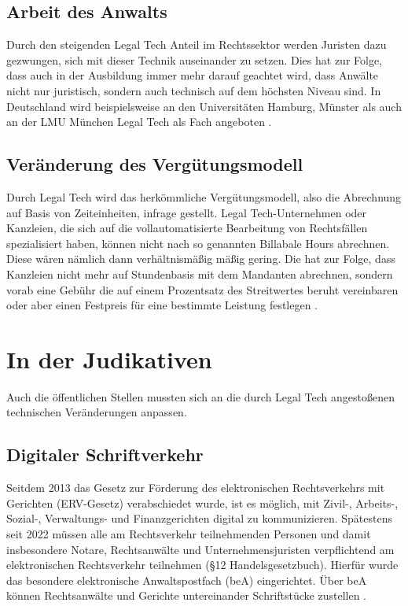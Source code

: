 \subsection{Arbeit des Anwalts}
Durch den steigenden Legal Tech Anteil im Rechtssektor werden Juristen dazu gezwungen, sich mit dieser Technik auseinander zu setzen. Dies hat zur Folge, dass auch in der Ausbildung immer mehr darauf geachtet wird, dass Anwälte nicht nur juristisch, sondern auch technisch auf dem höchsten Niveau sind. In Deutschland wird beispielsweise an den Universitäten Hamburg, Münster als auch an der LMU München Legal Tech als Fach angeboten . 
\subsection{Veränderung des Vergütungsmodell}
Durch Legal Tech wird das herkömmliche Vergütungsmodell, also die Abrechnung auf Basis von Zeiteinheiten, infrage gestellt. Legal Tech-Unternehmen oder Kanzleien, die sich auf die vollautomatisierte Bearbeitung von Rechtsfällen spezialisiert haben, können nicht nach so genannten Billabale Hours abrechnen. Diese wären nämlich dann verhältnismäßig mäßig gering. Die hat zur Folge, dass Kanzleien nicht mehr auf Stundenbasis mit dem Mandanten abrechnen, sondern vorab eine Gebühr die auf einem Prozentsatz des Streitwertes beruht vereinbaren oder aber einen Festpreis für eine bestimmte Leistung festlegen . 

\section{In der Judikativen}
Auch die öffentlichen Stellen mussten sich an die durch Legal Tech angestoßenen technischen Veränderungen anpassen.
\subsection{Digitaler Schriftverkehr} \label{DigitalerSchriftverkehr}
Seitdem 2013 das Gesetz zur Förderung des elektronischen Rechtsverkehrs mit Gerichten (ERV-Gesetz) verabschiedet wurde, ist es möglich, mit Zivil-, Arbeits-, Sozial-, Verwaltungs- und Finanzgerichten digital zu kommunizieren. Spätestens seit 2022 müssen alle am Rechtsverkehr teilnehmenden Personen und damit insbesondere Notare, Rechtsanwälte und Unternehmensjuristen verpflichtend am elektronischen Rechtsverkehr teilnehmen (§12 Handelsgesetzbuch). Hierfür wurde das besondere elektronische Anwaltspostfach (beA) eingerichtet. Über beA können Rechtsanwälte und Gerichte untereinander Schriftstücke zustellen .

